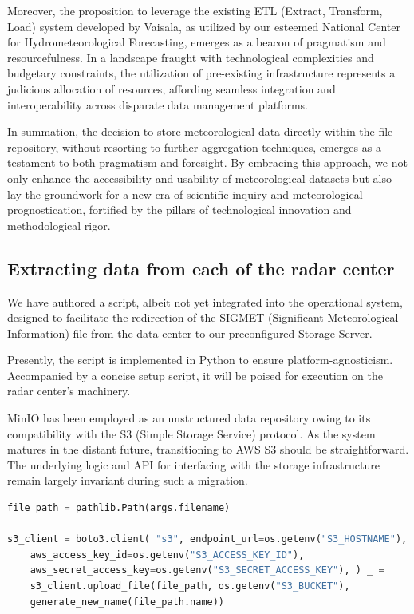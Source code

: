 Moreover, the proposition to leverage the existing ETL (Extract, Transform,
Load) system developed by Vaisala, as utilized by our esteemed National Center
for Hydrometeorological Forecasting, emerges as a beacon of pragmatism and
resourcefulness. In a landscape fraught with technological complexities and
budgetary constraints, the utilization of pre-existing infrastructure represents
a judicious allocation of resources, affording seamless integration and
interoperability across disparate data management platforms.

In summation, the decision to store meteorological data directly within the file
repository, without resorting to further aggregation techniques, emerges as a
testament to both pragmatism and foresight. By embracing this approach, we not
only enhance the accessibility and usability of meteorological datasets but also
lay the groundwork for a new era of scientific inquiry and meteorological
prognostication, fortified by the pillars of technological innovation and
methodological rigor.


\subsection{Extracting data from each of the radar center}
We have authored a script, albeit not yet integrated into the operational
system, designed to facilitate the redirection of the SIGMET (Significant
Meteorological Information) file from the data center to our preconfigured
Storage Server.

Presently, the script is implemented in Python to ensure platform-agnosticism.
Accompanied by a concise setup script, it will be poised for execution on the
radar center's machinery.

MinIO has been employed as an unstructured data repository owing to its
compatibility with the S3 (Simple Storage Service) protocol. As the system
matures in the distant future, transitioning to AWS S3 should be
straightforward. The underlying logic and API for interfacing with the storage
infrastructure remain largely invariant during such a migration.

\begin{lstlisting}[language=Python, caption={Part of the script for uploading data to Storage}]
file_path = pathlib.Path(args.filename)

s3_client = boto3.client( "s3", endpoint_url=os.getenv("S3_HOSTNAME"),
    aws_access_key_id=os.getenv("S3_ACCESS_KEY_ID"),
    aws_secret_access_key=os.getenv("S3_SECRET_ACCESS_KEY"), ) _ =
    s3_client.upload_file(file_path, os.getenv("S3_BUCKET"),
    generate_new_name(file_path.name))
\end{lstlisting}

